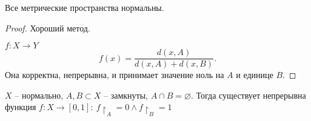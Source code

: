 \documentclass[12pt]{report}
\begin{document}
\begin{defn}
    Все метрические пространства нормальны.
\end{defn}
\begin{proof}
    Хороший метод.

    $ f: X \to  Y$
    \[
	f(x) = \frac{d(x, A)}{d(x, A) + d(x, B)}
    .\] 
    Она корректна, непрерывна, и принимает значение ноль на $ A$  и  единице $ B$.
\end{proof}
\begin{lm}[Урысон]
    $ X$ -- нормально, $ A, B \subset  X$ -- замкнуты, $ A \cap  B = \varnothing$. Тогда существует непрерывна функция $ f: X \to  [0, 1]: ~ f\upharpoonright_A = 0 \wedge f\upharpoonright_B = 1$
    
\end{lm}
\end{document}
